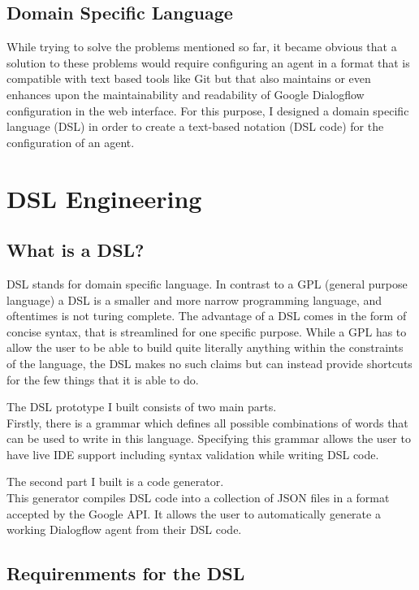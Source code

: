 \subsection{Domain Specific Language}
While trying to solve the problems mentioned so far, it became obvious that a solution to these problems would require configuring an agent in a format that is compatible with text based tools like Git but that also maintains or even enhances upon the maintainability and readability of Google Dialogflow configuration in the web interface.
For this purpose, I designed a domain specific language (DSL) in order to create a text-based notation (DSL code) for the configuration of an agent.


\section{DSL Engineering}


\subsection{What is a DSL?}

DSL stands for domain specific language. In contrast to a GPL (general purpose language) a DSL is a smaller and more narrow programming language, and oftentimes is not turing complete. The advantage of a DSL comes in the form of concise syntax, that is streamlined for one specific purpose. While a GPL has to allow the user to be able to build quite literally anything within the constraints of the language, the DSL makes no such claims but can instead provide shortcuts for the few things that it is able to do.

The DSL prototype I built consists of two main parts.\\
Firstly, there is a grammar which defines all possible combinations of words that can be used to write in this language.
Specifying this grammar allows the user to have live IDE support including syntax validation while writing DSL code.

The second part I built is a code generator.\\
This generator compiles DSL code into a collection of JSON files in a format accepted by the Google API. It allows the user to automatically generate a working Dialogflow agent from their DSL code.

\subsection{Requirenments for the DSL}

